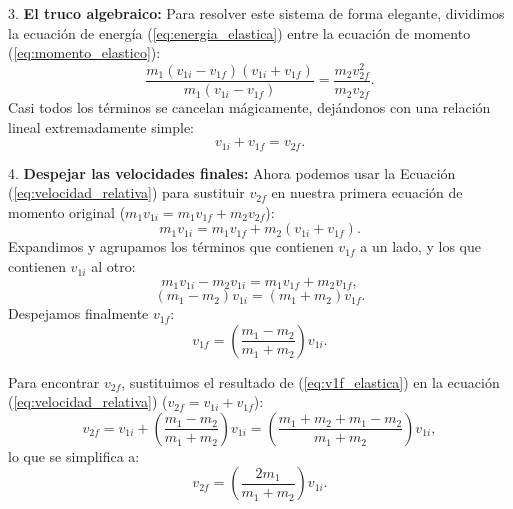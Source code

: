 \documentclass[11pt,a4paper]{book}
\begin{document}
3. \textbf{El truco algebraico:} 
Para resolver este sistema de forma elegante, dividimos la ecuación de energía (\ref{eq:energia_elastica}) entre la ecuación de momento (\ref{eq:momento_elastico}):
\begin{equation}
    \frac{m_1 (v_{1i} - v_{1f})(v_{1i} + v_{1f})}{m_1 (v_{1i} - v_{1f})} = \frac{m_2 v_{2f}^2}{m_2 v_{2f}}.
\end{equation}
Casi todos los términos se cancelan mágicamente, dejándonos con una relación lineal extremadamente simple:
\begin{equation}
    v_{1i} + v_{1f} = v_{2f}.
    \label{eq:velocidad_relativa}
\end{equation}

4. \textbf{Despejar las velocidades finales:}
Ahora podemos usar la Ecuación (\ref{eq:velocidad_relativa}) para sustituir $v_{2f}$ en nuestra primera ecuación de momento original ($m_1 v_{1i} = m_1 v_{1f} + m_2 v_{2f}$):
\begin{equation}
    m_1 v_{1i} = m_1 v_{1f} + m_2 (v_{1i} + v_{1f}).
\end{equation}
Expandimos y agrupamos los términos que contienen $v_{1f}$ a un lado, y los que contienen $v_{1i}$ al otro:
\begin{equation}
    m_1 v_{1i} - m_2 v_{1i} = m_1 v_{1f} + m_2 v_{1f},
\end{equation}
\begin{equation}
    (m_1 - m_2)v_{1i} = (m_1 + m_2)v_{1f}.
\end{equation}
Despejamos finalmente $v_{1f}$:
\begin{equation}
    v_{1f} = \left( \frac{m_1 - m_2}{m_1 + m_2} \right) v_{1i}.
    \label{eq:v1f_elastica}
\end{equation}

Para encontrar $v_{2f}$, sustituimos el resultado de (\ref{eq:v1f_elastica}) en la ecuación (\ref{eq:velocidad_relativa}) ($v_{2f} = v_{1i} + v_{1f}$):
\begin{equation}
    v_{2f} = v_{1i} + \left( \frac{m_1 - m_2}{m_1 + m_2} \right) v_{1i} = \left( \frac{m_1 + m_2 + m_1 - m_2}{m_1 + m_2} \right) v_{1i},
\end{equation}
lo que se simplifica a:
\begin{equation}
    v_{2f} = \left( \frac{2m_1}{m_1 + m_2} \right) v_{1i}.
    \label{eq:v2f_elastica}
\end{equation}
\end{document}
